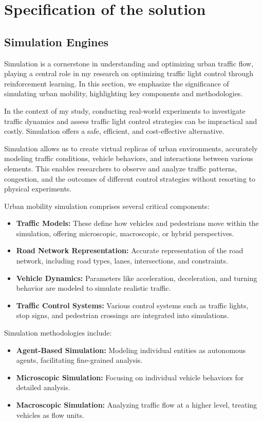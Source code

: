 \chapter{Specification of the solution}
\section{Simulation Engines}
Simulation is a cornerstone in understanding and optimizing urban traffic flow, playing a central role in my research on optimizing traffic light control through reinforcement learning. In this section, we emphasize the significance of simulating urban mobility, highlighting key components and methodologies.

In the context of my study, conducting real-world experiments to investigate traffic dynamics and assess traffic light control strategies can be impractical and costly. Simulation offers a safe, efficient, and cost-effective alternative.

Simulation allows us to create virtual replicas of urban environments, accurately modeling traffic conditions, vehicle behaviors, and interactions between various elements. This enables researchers to observe and analyze traffic patterns, congestion, and the outcomes of different control strategies without resorting to physical experiments.

Urban mobility simulation comprises several critical components:

\begin{itemize}
    \item \textbf{Traffic Models:} These define how vehicles and pedestrians move within the simulation, offering microscopic, macroscopic, or hybrid perspectives.
    \item \textbf{Road Network Representation:} Accurate representation of the road network, including road types, lanes, intersections, and constraints.
    \item \textbf{Vehicle Dynamics:} Parameters like acceleration, deceleration, and turning behavior are modeled to simulate realistic traffic.
    \item \textbf{Traffic Control Systems:} Various control systems such as traffic lights, stop signs, and pedestrian crossings are integrated into simulations.
\end{itemize}

Simulation methodologies include:

\begin{itemize}
    \item \textbf{Agent-Based Simulation:} Modeling individual entities as autonomous agents, facilitating fine-grained analysis.
    \item \textbf{Microscopic Simulation:} Focusing on individual vehicle behaviors for detailed analysis.
    \item \textbf{Macroscopic Simulation:} Analyzing traffic flow at a higher level, treating vehicles as flow units.
\end{itemize}


